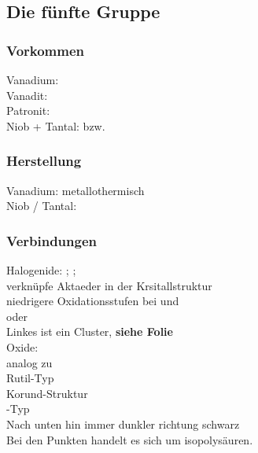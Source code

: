 \documentclass{article}
\begin{document}
\subsection{Die fünfte Gruppe}
\subsubsection{Vorkommen}
Vanadium:\\
Vanadit: \\
Patronit: \\
Niob + Tantal:  bzw. \\
\subsubsection{Herstellung}
Vanadium:  metallothermisch\\
Niob / Tantal: \\
\subsubsection{Verbindungen}
Halogenide: ; ;\\
verknüpfe Aktaeder in der Krsitallstruktur\\
niedrigere Oxidationsstufen bei  und \\
 oder \\
Linkes ist ein Cluster, \textbf{siehe Folie}\\
Oxide:\\
 analog zu  \\
 Rutil-Typ\\
 Korund-Struktur\\
 -Typ\\
Nach unten hin immer dunkler richtung schwarz\\
Bei den Punkten handelt es sich um isopolysäuren.
\end{document}
